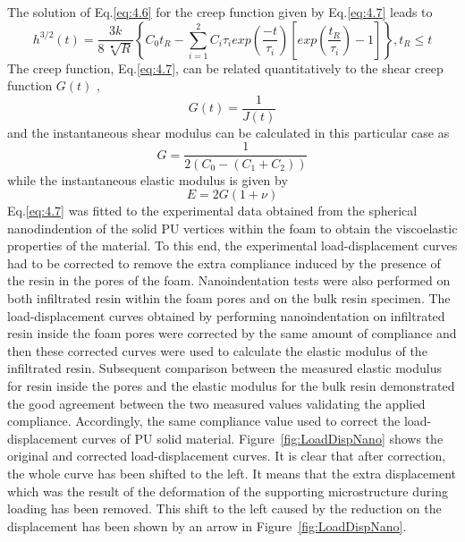 \documentclass[review]{elsarticle}
\begin{document}
The solution of Eq.\eqref{eq:4.6} for the creep function given by Eq.\eqref{eq:4.7} leads to
\begin{equation}
h^{3/2}(t)=\frac{3k}{8\ \sqrt[•]{R}}\left\{C_0t_R-\sum_{i=1}^{2} C_i\tau_i exp\left(\frac{-t}{\tau_i}\right) \left[exp\left(\frac{t_R}{\tau_i}\right)-1\right]\right\},t_R\leq t
\label{eq:4.8}
\end{equation}
The creep function, Eq.\eqref{eq:4.7}, can be related quantitatively to the shear creep function $G(t)$ \citep{johnson1985contacMech}, 
\begin{equation}
G(t)=\frac{1}{J(t)}
\label{eq:4.9}
\end{equation}
and the instantaneous shear modulus can be calculated in this particular case as \citep{oyen2005}
\begin{equation}
G=\frac{1}{2(C_0-(C_1+C_2))}
\label{eq:4.10}
\end{equation}
while the instantaneous elastic modulus is given by \citep{johnson1985contacMech}
\begin{equation}
E=2G(1+\nu)
\label{eq:4.11}
\end{equation}
Eq.\eqref{eq:4.7} was fitted to the experimental data obtained from the spherical nanodindention of the solid PU vertices within the foam to obtain the viscoelastic properties of the material. To this end, the experimental load-displacement curves had to be corrected to remove the extra compliance induced by the presence of the resin in the pores of the foam. Nanoindentation tests were also performed on both infiltrated resin within the foam pores and on the bulk resin specimen. The load-displacement curves obtained by performing nanoindentation on infiltrated resin inside the foam pores were corrected by the same amount of compliance and then these corrected curves were used to calculate the elastic modulus of the infiltrated resin. Subsequent comparison between the measured elastic modulus for resin inside the pores and the elastic modulus for the bulk resin demonstrated the good agreement between the two measured values validating the applied compliance. Accordingly, the same compliance value used to correct the load-displacement curves of PU solid material. Figure~\ref{fig:LoadDispNano} shows the original and corrected load-displacement curves. It is clear that after correction, the whole curve has been shifted to the left. It means that the extra displacement which was the result of the deformation of the supporting microstructure during loading has been removed. This shift to the left caused by the reduction on the displacement has been shown by an arrow in Figure~\ref{fig:LoadDispNano}.
\end{document}
